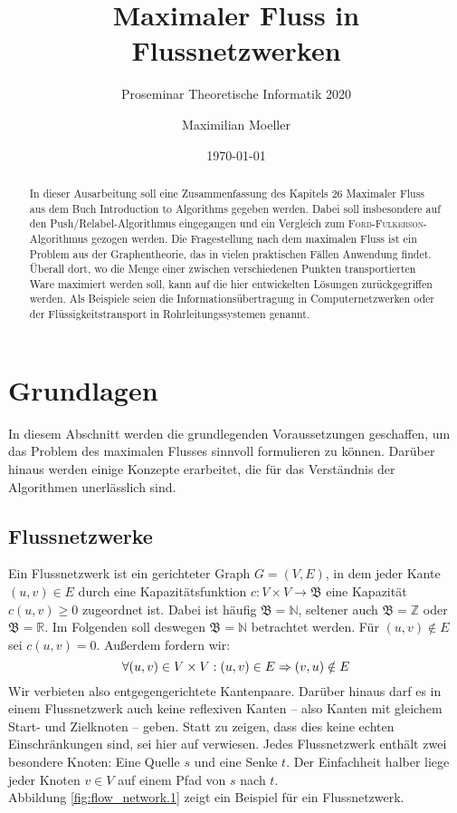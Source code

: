 \documentclass[12pt,a4paper,titlepage,onecolumn,ngerman,bibliography=totocnumbered]{scrartcl}
\author{Maximilian Moeller}
\title{Maximaler Fluss in Flussnetzwerken}
\subtitle{Proseminar Theoretische Informatik 2020}
\date{\today}
\theoremstyle{definition}
\theoremstyle{remark}
\newcommand{\ff}{\textsc{Ford-Fulkerson}}
\newcommand{\pr}{Push/Relabel}
\begin{document}
\maketitle
\nocite{*}

\tableofcontents

\begin{abstract}
In dieser Ausarbeitung soll eine Zusammenfassung des Kapitels 26 \glqq Maximaler Fluss\grqq{} aus dem Buch \glqq Introduction to Algorithms\grqq{} \parencite{Cormen09} gegeben werden. 
Dabei soll insbesondere auf den \pr -Algorithmus eingegangen und ein Vergleich zum \ff -Algorithmus gezogen werden.
\medbreak
Die Fragestellung nach dem maximalen Fluss ist ein Problem aus der Graphentheorie, das
in vielen praktischen Fällen Anwendung findet. 
Überall dort, wo die Menge einer zwischen verschiedenen Punkten transportierten Ware maximiert werden soll, kann auf die hier entwickelten Lösungen zurückgegriffen werden. 
Als Beispiele seien die Informationsübertragung in Computernetzwerken oder der Flüssigkeitstransport in Rohrleitungssystemen genannt. 
\end{abstract}

\section{Grundlagen}
In diesem Abschnitt werden die grundlegenden Voraussetzungen geschaffen, um das Problem des maximalen Flusses sinnvoll formulieren zu können.
Darüber hinaus werden einige Konzepte erarbeitet, die für das Verständnis der Algorithmen unerlässlich sind.

\subsection{Flussnetzwerke}
Ein Flussnetzwerk ist ein gerichteter Graph $G = (V,E)$, in dem jeder Kante $(u,v) \in E$ durch eine Kapazitätsfunktion $c: V\times V\to\mathfrak{B}$ eine Kapazität $c(u,v) \geq 0$ zugeordnet ist.
Dabei ist häufig $\mathfrak{B} = \mathbb{N}$, seltener auch $\mathfrak{B} = \mathbb{Z}$ oder $\mathfrak{B} = \mathbb{R}$.
Im Folgenden soll deswegen $\mathfrak{B} = \mathbb{N}$ betrachtet werden.
Für $(u,v) \notin E$ sei $c(u,v) = 0$.
Außerdem fordern wir:
\begin{equation} \label{no_parallel}
\forall (u,v)\in V\times V: (u,v)\in E \Rightarrow (v,u)\notin E\\
\end{equation}
Wir verbieten also entgegengerichtete Kantenpaare.
Darüber hinaus darf es in einem Flussnetzwerk auch keine reflexiven Kanten -- also Kanten mit gleichem Start- und Zielknoten -- geben.
Statt zu zeigen, dass dies keine echten Einschränkungen sind, sei hier auf \cite[][S. 724 f.]{Cormen09} verwiesen.
\medbreak
Jedes Flussnetzwerk enthält zwei besondere Knoten: Eine Quelle $s$ und eine Senke $t$.
Der Einfachheit halber liege jeder Knoten $v \in V$ auf einem Pfad von $s$ nach $t$.\\
Abbildung \ref{fig:flow_network.1} zeigt ein Beispiel für ein Flussnetzwerk.
\end{document}
